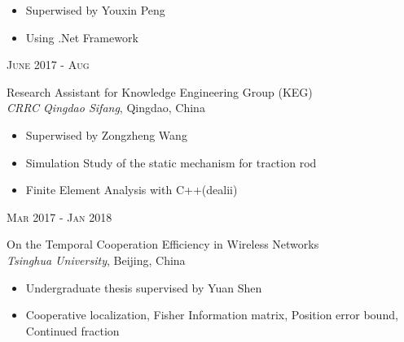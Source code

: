 \documentclass[10pt]{article} %
\begin{document}
{\begin{minipage}[t]{0.5\textwidth}
\normalsize{\begin{itemize}
		\item Superwised by Youxin Peng
		\item Using .Net Framework 
\end{itemize}}

{\raggedleft\textsc{June 2017 - Aug}\par}

{\raggedright\large Research Assistant for Knowledge Engineering Group (KEG)\\
\textit{CRRC Qingdao Sifang}, Qingdao, China\\[5pt]}

\normalsize{\begin{itemize}
		\item Superwised by Zongzheng Wang
		\item Simulation Study of the static mechanism for traction rod 
		\item Finite Element Analysis with C++(dealii)
\end{itemize}}

{\raggedleft\textsc{Mar 2017 - Jan 2018}\par}

{\raggedright\large On the Temporal Cooperation Efficiency in Wireless Networks\\
	\textit{Tsinghua University}, Beijing, China\\[5pt]}

\normalsize{\begin{itemize}
		\item Undergraduate thesis supervised by Yuan Shen
		\item Cooperative localization, Fisher Information matrix, Position error bound, Continued fraction
\end{itemize}}




\end{minipage} %
\hfill
\begin{minipage}[t]{0.44\textwidth} %
\vspace{0pt} %



\end{minipage}}
\end{document}
